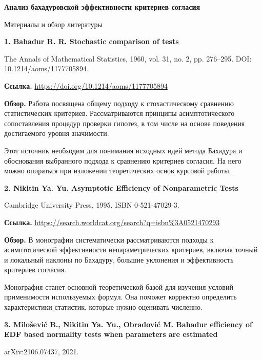 \documentclass[12pt,a4paper]{article}
\begin{document}
\begin{center}
{\Large\bfseries Анализ бахадуровской эффективности критериев согласия}\par
\vspace{0.3cm}
{\large Материалы и обзор литературы}\par
\end{center}
\vspace{0.25cm}
\par\noindent\textbf{1. Bahadur R. R. Stochastic comparison of tests}\par
The Annals of Mathematical Statistics, 1960, vol. 31, no. 2, pp. 276–295. DOI: 10.1214/aoms/1177705894.\par
\noindent\textbf{Ссылка.} \url{https://doi.org/10.1214/aoms/1177705894}\par
\noindent\textbf{Обзор.} Работа посвящена общему подходу к стохастическому сравнению статистических критериев. Рассматриваются принципы асимптотического сопоставления процедур проверки гипотез, в том числе на основе поведения достигаемого уровня значимости.\par
Этот источник необходим для понимания исходных идей метода Бахадура и обоснования выбранного подхода к сравнению критериев согласия. На него можно опираться при изложении теоретических основ курсовой работы.\par
\par\noindent\textbf{2. Nikitin Ya. Yu. Asymptotic Efficiency of Nonparametric Tests}\par
Cambridge University Press, 1995. ISBN 0-521-47029-3.\par
\noindent\textbf{Ссылка.} \url{https://search.worldcat.org/search?q=isbn%3A0521470293}\par
\noindent\textbf{Обзор.} В монографии систематически рассматриваются подходы к асимптотической эффективности непараметрических критериев, включая точный и локальный наклоны по Бахадуру, большие уклонения и эффективность критериев согласия.\par
Монография станет основной теоретической базой для изучения условий применимости используемых формул. Она поможет корректно определить характеристики статистик, которые нужно оценивать численно.\par
\par\noindent\textbf{3. Milošević B., Nikitin Ya. Yu., Obradović M. Bahadur efficiency of EDF based normality tests when parameters are estimated}\par
arXiv:2106.07437, 2021.\par
\end{document}
